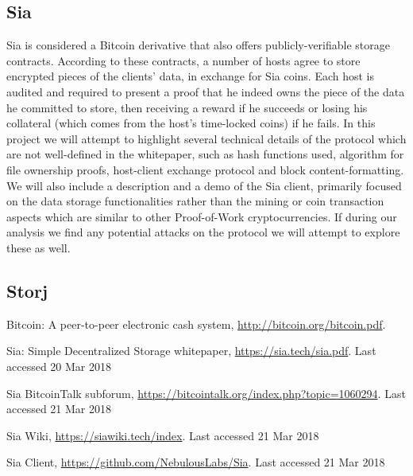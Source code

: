 \documentclass[runningheads]{llncs}
\begin{document}
\subsection{Sia}
Sia\cite{sia_white} is considered a Bitcoin derivative that also offers publicly-verifiable storage contracts. According to these contracts, a number of hosts agree to store encrypted pieces of the clients' data, in exchange for Sia coins. Each host is audited and required to present a proof that he indeed owns the piece of the data he committed to store, then receiving a reward if he succeeds or losing his collateral (which comes from the host's time-locked coins) if he fails. In this project we will attempt to highlight several technical details of the protocol which are not well-defined in the whitepaper, such as hash functions used, algorithm for file ownership proofs, host-client exchange protocol and block content-formatting. We will also include a description and a demo of the Sia client, primarily focused on the data storage functionalities rather than the mining or coin transaction aspects which are similar to other Proof-of-Work cryptocurrencies. If during our analysis we find any potential attacks on the protocol we will attempt to explore these as well.

\subsection{Storj}

\begin{thebibliography}{8}

Bitcoin: A peer-to-peer electronic cash system, \url{http://bitcoin.org/bitcoin.pdf}.


Sia: Simple Decentralized Storage whitepaper, \url{https://sia.tech/sia.pdf}. Last accessed 20
Mar 2018


Sia BitcoinTalk subforum, \url{https://bitcointalk.org/index.php?topic=1060294}. Last accessed 21
Mar 2018

Sia Wiki, \url{https://siawiki.tech/index}. Last accessed 21
Mar 2018

Sia Client, \url{https://github.com/NebulousLabs/Sia}. Last accessed 21
Mar 2018
\end{thebibliography}
\end{document}
